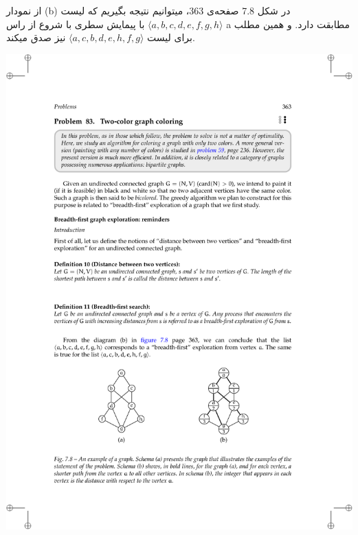 \documentclass{book} %
\newcommand{\imgcaption}[1]{\color[HTML]{4F4D4D}\footnotesize{#1}}
\begin{document}
از نمودار (b) در شکل 7.8 صفحه‌ی 363، میتوانیم نتیجه بگیریم که لیست $⟨a, b, c, d, e, f, g, h⟩$ با پیمایش سطری با شروع از راس a مطابقت دارد. و همین مطلب برای لیست $⟨a, c, b, d, e, h, f, g⟩$ نیز صدق میکند.

    
  
  



\begin{center}
    \includegraphics{./fig7.8.pdf}

\end{center}
\end{document}
